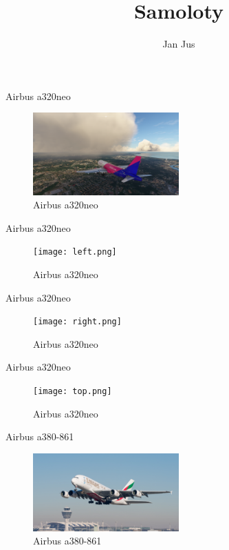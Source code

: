 \documentclass{beamer}
\title{Samoloty}
\author{Jan Jus}
\begin{document}
\begin{frame}
\titlepage
\end{frame}

\begin{frame}{Airbus a320neo}
\begin{figure}
    \centering
    \includegraphics[width=0.5\textwidth]{landing.png}
    \caption{Airbus a320neo}
    \end{figure}
  \label{pic:pic1}
\end{frame}


\begin{frame}{Airbus a320neo}
\begin{figure}
    \centering
    \texttt{[image: left.png]}
    \caption{Airbus a320neo}
    \end{figure}
  \label{pic:pic2}
\end{frame}


\begin{frame}{Airbus a320neo}
\begin{figure}
    \centering
    \texttt{[image: right.png]}
    \caption{Airbus a320neo}
    \end{figure}
  \label{pic:pic3}
\end{frame}


\begin{frame}{Airbus a320neo}
\begin{figure}
    \centering
    \texttt{[image: top.png]}
    \caption{Airbus a320neo}
    \end{figure}
  \label{pic:pic4}
\end{frame}


\begin{frame}{Airbus a380-861}
\begin{figure}
    \centering
    \includegraphics[width=0.5\textwidth]{a380.jpg}
    \caption{Airbus a380-861}
    \end{figure}
  \label{pic:pic5}
\end{frame}
\end{document}
